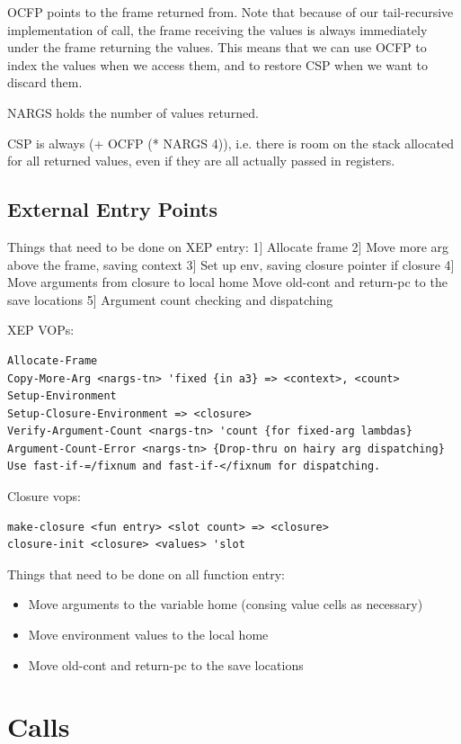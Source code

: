     OCFP points to the frame returned from.  Note that because of our
    tail-recursive implementation of call, the frame receiving the values is
    always immediately under the frame returning the values.  This means that
    we can use OCFP to index the values when we access them, and to restore
    CSP when we want to discard them.

    NARGS holds the number of values returned.

    CSP is always (+ OCFP (* NARGS 4)), i.e. there is room on the stack
    allocated for all returned values, even if they are all actually passed in
    registers.

\subsection{External Entry Points}

Things that need to be done on XEP entry:
 1] Allocate frame
 2] Move more arg above the frame, saving context
 3] Set up env, saving closure pointer if closure
 4] Move arguments from closure to local home
    Move old-cont and return-pc to the save locations
 5] Argument count checking and dispatching

XEP VOPs:
\begin{verbatim}
Allocate-Frame
Copy-More-Arg <nargs-tn> 'fixed {in a3} => <context>, <count>
Setup-Environment
Setup-Closure-Environment => <closure>
Verify-Argument-Count <nargs-tn> 'count {for fixed-arg lambdas}
Argument-Count-Error <nargs-tn> {Drop-thru on hairy arg dispatching}
Use fast-if-=/fixnum and fast-if-</fixnum for dispatching.
\end{verbatim}

Closure vops:
\begin{verbatim}
make-closure <fun entry> <slot count> => <closure>
closure-init <closure> <values> 'slot
\end{verbatim}

Things that need to be done on all function entry:
\begin{itemize}
\item Move arguments to the variable home (consing value cells as necessary)
\item Move environment values to the local home
\item Move old-cont and return-pc to the save locations
\end{itemize}
\section{Calls}

